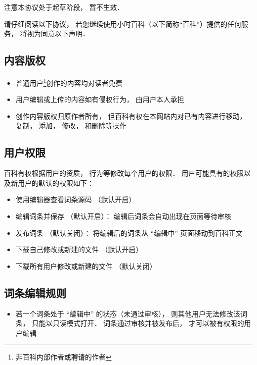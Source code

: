 
注意本协议处于起草阶段， 暂不生效．

请仔细阅读以下协议， 若您继续使用小时百科（以下简称“百科”）提供的任何服务， 将视为同意以下声明．

\subsection{内容版权}
\begin{itemize}
\item 普通用户\footnote{非百科内部作者或聘请的作者}创作的内容均对读者免费
\item 用户编辑或上传的内容如有侵权行为， 由用户本人承担
\item 创作内容版权归原作者所有， 但百科有权在本网站内对已有内容进行移动， 复制， 添加， 修改， 和删除等操作
\end{itemize}

\subsection{用户权限}
百科有权根据用户的资质， 行为等修改每个用户的权限． 用户可能具有的权限以及新用户的默认的权限如下：
\begin{itemize}
\item 使用编辑器查看词条源码 （默认开启）
\item 编辑词条并保存 （默认开启）： 编辑后词条会自动出现在页面等待审核
\item 发布词条 （默认关闭）： 将编辑后的词条从 “编辑中” 页面移动到百科正文
\item 下载自己修改或新建的文件 （默认开启）
\item 下载所有用户修改或新建的文件 （默认关闭）
\end{itemize}

\subsection{词条编辑规则}
\begin{itemize}
\item 若一个词条处于 “编辑中” 的状态（未通过审核）， 则其他用户无法修改该词条， 只能以只读模式打开． 词条通过审核并被发布后， 才可以被有权限的用户编辑
\end{itemize}

